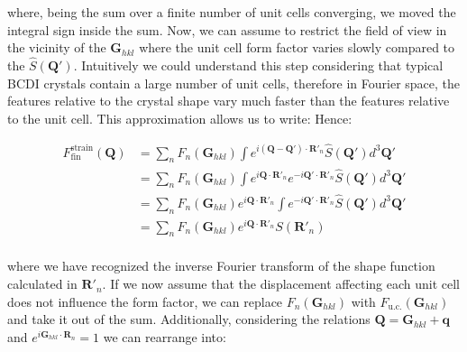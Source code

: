 where, being the sum over a finite number of unit cells converging, we moved the integral sign inside the sum. 
Now, we can assume to restrict the field of view in the vicinity of the $\mathbf{G}_{hkl}$ where the unit cell 
form factor varies slowly compared to the $\widehat{S}(\mathbf{Q'})$. Intuitively we could understand this step considering 
that typical BCDI crystals contain a large number of unit cells, therefore in Fourier space, the features relative to 
the crystal shape vary much faster than the features relative to the unit cell. This approximation allows us to write:
Hence: 

\begin{equation}
    \begin{aligned}
    F^{\text{strain}}_{\text{fin}}(\mathbf{Q}) &=  
    \sum_{n} F_n(\mathbf{G}_{hkl}) \int  e^{i (\mathbf{Q} -\mathbf{Q'}) \cdot \mathbf{R}'_n} \widehat{S}(\mathbf{Q'})d^3\mathbf{Q'} \\ 
    &= \sum_{n} F_n(\mathbf{G}_{hkl}) \int  e^{i \mathbf{Q} \cdot \mathbf{R}'_n } e^{-i \mathbf{Q'} \cdot \mathbf{R}'_n} \widehat{S}(\mathbf{Q'})d^3\mathbf{Q'} \\ 
    &= \sum_{n} F_n(\mathbf{G}_{hkl}) e^{i \mathbf{Q} \cdot \mathbf{R}'_n } \int e^{-i \mathbf{Q'} \cdot \mathbf{R}'_n} \widehat{S}(\mathbf{Q'})d^3\mathbf{Q'} \\ 
    &= \sum_{n} F_n(\mathbf{G}_{hkl}) e^{i \mathbf{Q} \cdot \mathbf{R}'_n } S(\mathbf{R}'_n) \\
   \label{eq:strain_fin3}
    \end{aligned}
\end{equation}

where we have recognized the inverse Fourier transform of the shape function calculated in $\mathbf{R}'_n$. 
If we now assume that the displacement affecting each unit cell does not influence the form factor, 
we can replace $F_n(\mathbf{G}_{hkl})$ with $F_{\text{u.c.}}(\mathbf{G}_{hkl})$ and take it out of the sum. 
Additionally, considering the relations $\mathbf{Q} = \mathbf{G}_{hkl} + \mathbf{q}$ and $e^{i \mathbf{G}_{hkl} \cdot \mathbf{R}_n}  = 1$
we can rearrange into: 

